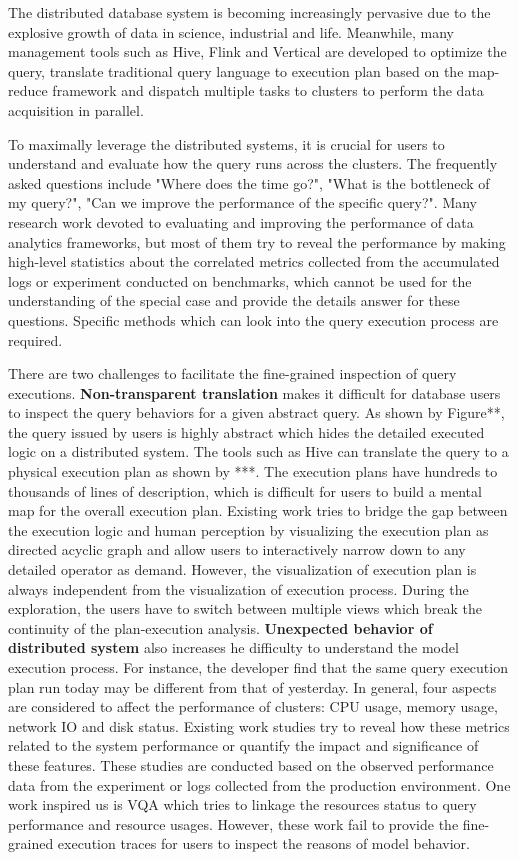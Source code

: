 The distributed database system is becoming increasingly pervasive due to the explosive growth of data in science, industrial and life.
Meanwhile, many management tools such as Hive, Flink and Vertical are developed to optimize the query, translate traditional query language to execution plan based on the map-reduce framework and dispatch multiple tasks to clusters to perform the data acquisition in parallel.

To maximally leverage the distributed systems, it is crucial for users to understand and evaluate how the query runs across the clusters. The frequently asked questions include "Where does the time go?", "What is the bottleneck of my query?", "Can we improve the performance of the specific query?".  Many research work devoted to evaluating and improving the performance of data analytics frameworks, but most of them try to reveal the performance by making high-level statistics about the correlated metrics collected from the accumulated logs or experiment conducted on benchmarks, which cannot be used for the understanding of the special case and provide the details answer for these questions. Specific methods which can look into the query execution process are required.

There are two challenges to facilitate the fine-grained inspection of query executions. 
\textbf{Non-transparent translation} makes it difficult for database users to inspect the query behaviors for a given abstract query. As shown by Figure**, the query issued by users is highly abstract which hides the detailed executed logic on a distributed system. The tools such as Hive can translate the query to a physical execution plan as shown by ***. The execution plans have hundreds to thousands of lines of description, which is difficult for users to build a mental map for the overall execution plan. Existing work tries to bridge the gap between the execution logic and human perception by visualizing the execution plan as directed acyclic graph and allow users to interactively narrow down to any detailed operator as demand. However, the visualization of execution plan is always independent from the visualization of execution process. During the exploration, the users have to switch between multiple views which break the continuity of the plan-execution analysis.
\textbf{Unexpected behavior of distributed system} also increases he difficulty to understand the model execution process. For instance, the developer find that the same query execution plan run today may be different from that of yesterday. In general, four aspects are considered to affect the performance of clusters: CPU usage, memory usage, network IO and disk status. Existing work studies try to reveal how these metrics related to the system performance or quantify the impact and significance of these features. These studies are conducted based on the observed performance data from the experiment or logs collected from the production environment. One work inspired us is VQA which tries to linkage the resources status to query performance and resource usages. However, these work fail to provide the fine-grained execution traces for users to inspect the reasons of model behavior.

